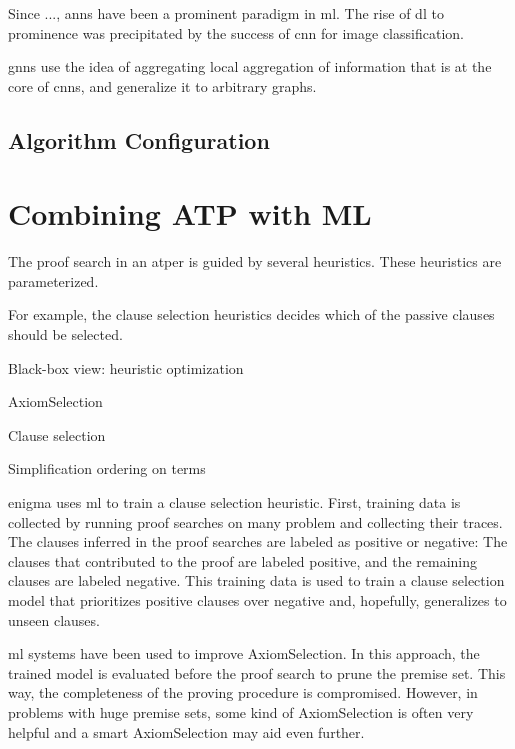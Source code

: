 Since ..., \glspl{ann} have been a prominent paradigm in \gls{ml}.
The rise of \gls{dl} to prominence was precipitated by the success of \gls{cnn} for image classification.

\Glspl{gnn} use the idea of aggregating local aggregation of information that is at the core of \glspl{cnn}, and generalize it to arbitrary graphs.

\subsection{Algorithm Configuration}

\section{Combining ATP with ML}

The proof search in an \gls{atper} is guided by several heuristics.
These heuristics are parameterized.

For example, the clause selection heuristics decides which of the passive clauses should be selected.

Black-box view: heuristic optimization

\Gls{AxiomSelection}

Clause selection

Simplification ordering on terms


\Gls{enigma} uses \gls{ml} to train a clause selection heuristic.
First, training data is collected by running proof searches on many problem and collecting their traces.
The clauses inferred in the proof searches are labeled as positive or negative:
The clauses that contributed to the proof are labeled positive, and the remaining clauses are labeled negative.
This training data is used to train a clause selection model that prioritizes positive clauses over negative and, hopefully, generalizes to unseen clauses.

\Gls{ml} systems have been used to improve \gls{AxiomSelection}.
In this approach, the trained model is evaluated before the proof search to prune the premise set.
This way, the completeness of the proving procedure is compromised.
However, in problems with huge premise sets, some kind of \gls{AxiomSelection} is often very helpful and a smart \gls{AxiomSelection} may aid even further.


